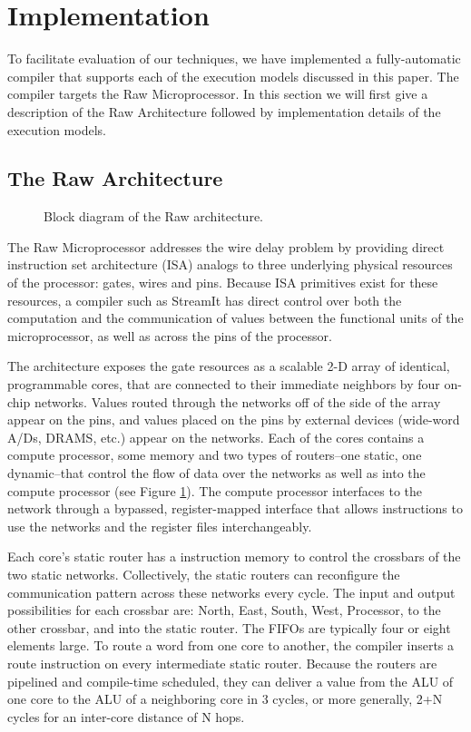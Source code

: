 \section{Implementation} 

To facilitate evaluation of our techniques, we have implemented a
fully-automatic compiler that supports each of the execution models
discussed in this paper.  The compiler targets the Raw
Microprocessor.  In this section we will first give a description of
the Raw Architecture followed by implementation details of the 
execution models.

\subsection{The Raw Architecture}
\label{sec:raw}

\begin{figure}
\centering
{}
\caption{Block diagram of the Raw architecture.
\protect\label{fig:raw-diagram}}
\end{figure}
The Raw Microprocessor \cite{raw10,raw} addresses the wire delay
problem \cite{raw13} by providing direct instruction set architecture
(ISA) analogs to three underlying physical resources of the processor:
gates, wires and pins. Because ISA primitives exist for these
resources, a compiler such as StreamIt has direct control over both
the computation and the communication of values between the functional
units of the microprocessor, as well as across the pins of the
processor.

The architecture exposes the gate resources as a scalable 2-D array of
identical, programmable cores, that are connected to their immediate
neighbors by four on-chip networks.  Values routed through the
networks off of the side of the array appear on the pins, and values
placed on the pins by external devices (wide-word A/Ds, DRAMS, etc.)
appear on the networks.  Each of the cores contains a compute
processor, some memory and two types of routers--one static, one
dynamic--that control the flow of data over the networks as well as
into the compute processor (see Figure \ref{fig:raw-diagram}).  The
compute processor interfaces to the network through a bypassed,
register-mapped interface \cite{raw10} that allows instructions to use
the networks and the register files interchangeably.

Each core's static router has a instruction memory to control the
crossbars of the two static networks. Collectively, the static routers
can reconfigure the communication pattern across these networks every
cycle.  The input and output possibilities for each crossbar are:
North, East, South, West, Processor, to the other crossbar, and into
the static router. The FIFOs are typically four or eight elements
large.  To route a word from one core to another, the compiler inserts
a route instruction on every intermediate static router.  Because the
routers are pipelined and compile-time scheduled, they can deliver a
value from the ALU of one core to the ALU of a neighboring core in 3
cycles, or more generally, 2+N cycles for an inter-core distance of N
hops.

